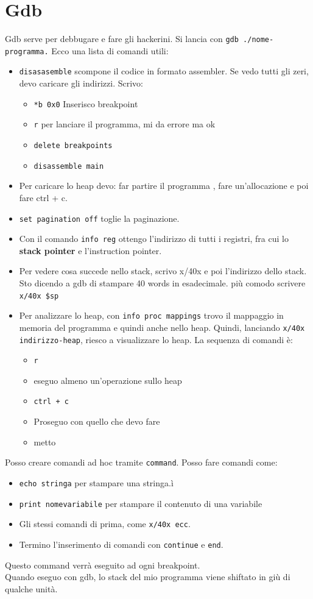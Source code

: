 \documentclass[a4paper,12pt]{article}
\begin{document}
\section{Gdb}
Gdb serve per debbugare e fare gli hackerini. Si lancia con \texttt{gdb ./nome-programma.} Ecco una lista di comandi utili:
\begin{itemize}
\item \texttt{disasasemble} scompone il codice in formato assembler. Se vedo tutti gli zeri, devo caricare gli indirizzi. Scrivo:
\begin{itemize}
 \item \texttt{*b 0x0} Inserisco breakpoint
 \item \texttt{r} per lanciare il programma, mi da errore ma ok
 \item \texttt{delete breakpoints}
 \item \texttt{disassemble main}
 \end{itemize}
 \item Per caricare lo heap devo: far partire il programma , fare un'allocazione e poi fare ctrl + c.
\item \texttt{set pagination off} toglie la paginazione.
\item Con il comando \texttt{info reg} ottengo l'indirizzo di tutti i registri, fra cui lo \textbf{stack pointer} e l'instruction pointer.
\item Per vedere cosa succede nello stack, scrivo x/40x e poi l'indirizzo dello stack. Sto dicendo a gdb di stampare 40 words in esadecimale. \E più comodo scrivere \texttt{x/40x \$sp}
\item Per analizzare lo heap, con \texttt{info proc mappings} trovo il mappaggio in memoria del programma e quindi anche nello heap. Quindi, lanciando \texttt{x/40x indirizzo-heap}, riesco a visualizzare lo heap. La sequenza di comandi è:
\begin{itemize}
\item \texttt{r}
\item eseguo almeno un'operazione sullo heap
\item \texttt{ctrl + c}
\item Proseguo con quello che devo fare
\item metto 
\end{itemize}
\end{itemize}
Posso creare comandi ad hoc tramite \texttt{command}. Posso fare comandi come:
\begin{itemize}
\item \texttt{echo stringa} per stampare una stringa.ì
\item \texttt{print nomevariabile} per stampare il contenuto di una variabile
\item Gli stessi comandi di prima, come \texttt{x/40x ecc}. 
\item Termino l'inserimento di comandi con \texttt{continue} e \texttt{end}.
\end{itemize}
Questo command verrà eseguito ad ogni breakpoint.\\
Quando eseguo con gdb, lo stack del mio programma viene shiftato in giù di qualche unità.
\end{document}
